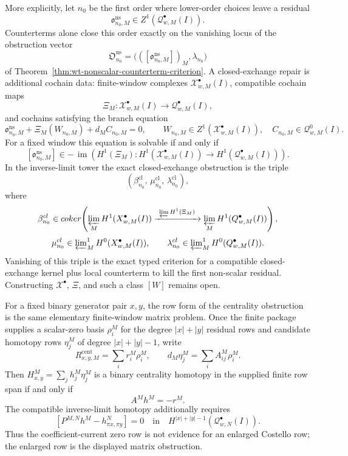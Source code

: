 \documentclass[11pt]{memoir}
\begin{document}
\begin{prob}
  More explicitly, let \(n_0\) be the first order where lower-order
  choices leave a residual
  \[
    \mathfrak o^{\mathrm{ns}}_{n_0,M}
      \in Z^1(\mathcal Q^\bullet_{w,M}(I)).
  \]
  Counterterms alone close this order exactly on the vanishing locus of
  the obstruction vector
  \[
    \mathfrak O^{\mathrm{ns}}_{n_0}
      =
      \bigl(([\mathfrak o^{\mathrm{ns}}_{n_0,M}])_M,\lambda_{n_0}\bigr)
  \]
  of Theorem~\ref{thm:wt-nonscalar-counterterm-criterion}.  A
  closed-exchange repair is additional cochain data: finite-window
  complexes \(\mathcal X^\bullet_{w,M}(I)\), compatible cochain maps
  \[
    \Xi_M\colon
    \mathcal X^\bullet_{w,M}(I)\longrightarrow
    \mathcal Q^\bullet_{w,M}(I),
  \]
  and cochains satisfying the branch equation
  \[
    \mathfrak o^{\mathrm{ns}}_{n_0,M}
      +\Xi_M(W_{n_0,M})
      +d_M C_{n_0,M}=0,
    \qquad
    W_{n_0,M}\in Z^1(\mathcal X^\bullet_{w,M}(I)),\quad
    C_{n_0,M}\in\mathcal Q^0_{w,M}(I).
  \]
  For a fixed window this equation is solvable if and only if
  \[
    [\mathfrak o^{\mathrm{ns}}_{n_0,M}]
      \in
    -\,\operatorname{im}\!\left(
      H^1(\Xi_M)\colon
      H^1(\mathcal X^\bullet_{w,M}(I))
      \to H^1(\mathcal Q^\bullet_{w,M}(I))
    \right).
  \]
  In the inverse-limit tower the exact closed-exchange obstruction is the
  triple
  \[
    \left(
      \beta^{\mathrm{cl}}_{n_0},\,
      \mu^{\mathrm{cl}}_{n_0},\,
      \lambda^{\mathrm{cl}}_{n_0}
    \right),
  \]
  where
  \[
    \beta^{\mathrm{cl}}_{n_0}\in
      \operatorname{coker}\!\left(
        \varprojlim_M H^1(\mathcal X^\bullet_{w,M}(I))
        \xrightarrow{\ \varprojlim H^1(\Xi_M)\ }
        \varprojlim_M H^1(\mathcal Q^\bullet_{w,M}(I))
      \right),
  \]
  \[
    \mu^{\mathrm{cl}}_{n_0}\in
      \varprojlim\nolimits^1_M H^0(\mathcal X^\bullet_{w,M}(I)),
    \qquad
    \lambda^{\mathrm{cl}}_{n_0}\in
      \varprojlim\nolimits^1_M H^0(\mathcal Q^\bullet_{w,M}(I)).
  \]
  Vanishing of this triple is the exact typed criterion for a compatible
  closed-exchange kernel plus local counterterm to kill the first
  non-scalar residual.  Constructing
  \(\mathcal X^\bullet\), \(\Xi\), and such a class \([W]\) remains open.

  For a fixed binary generator pair \(x,y\), the row form of the
  centrality obstruction is the same elementary finite-window matrix
  problem.  Once the finite package supplies a scalar-zero basis
  \(\rho^M_i\) for the degree \(|x|+|y|\) residual rows and candidate
  homotopy rows \(\eta^M_j\) of degree \(|x|+|y|-1\), write
  \[
    R^{\mathrm{cent}}_{x,y,M}=\sum_i r^M_i\rho^M_i,\qquad
    d_M\eta^M_j=\sum_i A^M_{ij}\rho^M_i .
  \]
  Then \(H^M_{x,y}=\sum_jh^M_j\eta^M_j\) is a binary centrality homotopy
  in the supplied finite row span if and only if
  \[
    A^Mh^M=-r^M .
  \]
  The compatible inverse-limit homotopy additionally requires
  \[
    [P^{M,N}h^M-h^N_{\pi x,\pi y}]
    =
    0
    \quad\text{in}\quad
    H^{|x|+|y|-1}(\mathcal Q^\bullet_{w,N}(I)).
  \]
  Thus the coefficient-current zero row is not evidence for an enlarged
  Costello row; the enlarged row is the displayed matrix obstruction.


\end{prob}
\end{document}
